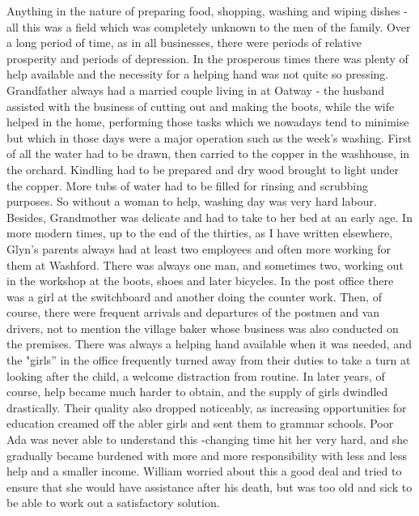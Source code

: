Anything in the nature of preparing food, shopping, washing and wiping dishes - all this was a field which was completely unknown to the men of the family. Over a long period of time, as in all businesses, there were periods of relative prosperity and periods of depression. In the prosperous times there was plenty of help available and the necessity for a helping hand was not quite so pressing. Grandfather always had a married couple living in at Oatway - the husband assisted with the business of cutting out and making the boots, while the wife helped in the home, performing those tasks which we nowadays tend to minimise but which in those days were a major operation such as the week's washing. First of all the water had to be drawn, then carried to the copper in the washhouse, in the orchard. Kindling had to be prepared and dry wood brought to light under the copper. More tubs of water had to be filled for rinsing and scrubbing purposes. So without a woman to help, washing day was very hard labour. Besides, Grandmother was delicate and had to take to her bed at an early age. In more modern times, up to the end of the thirties, as I have written elsewhere, Glyn's parents always had at least two employees and often more working for them at Washford. There was always one man, and sometimes two, working out in the workshop at the boots, shoes and later bicycles. In the post office there was a girl at the switchboard and another doing the counter work. Then, of course, there were frequent arrivals and departures of the postmen and van drivers, not to mention the village baker whose business was also conducted on the premises. There was always a helping hand available when it was needed, and the "girls” in the office frequently turned away from their duties to take a turn at looking after the child, a welcome distraction from routine. In later years, of course, help became much harder to obtain, and the supply of girls dwindled drastically. Their quality also dropped noticeably, as increasing opportunities for education creamed off the abler girls and sent them to grammar schools. Poor Ada was never able to understand this -changing time hit her very hard, and she gradually became burdened with more and more responsibility with less and less help and a smaller income. William worried about this a good deal and tried to ensure that she would have assistance after his death, but was too old and sick to be able to work out a satisfactory solution.

